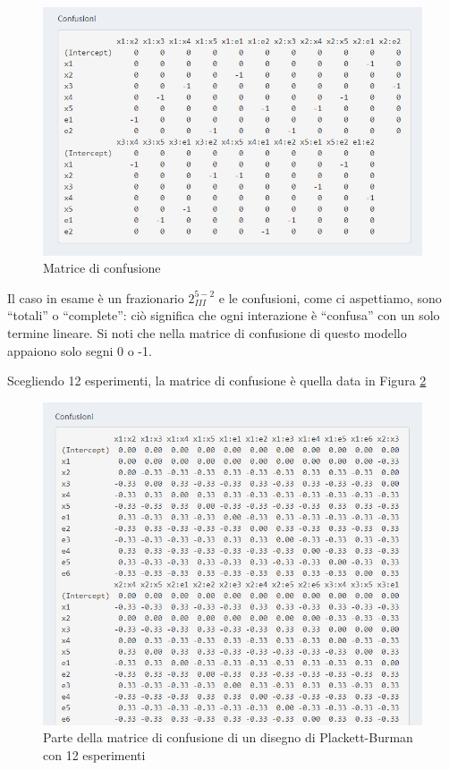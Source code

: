 \documentclass[
  11pt,
]{book}
\begin{document}
\begin{figure}[ht]

{\centering \includegraphics[width=1\linewidth]{Immagini/PB/02_matr_conf} 

}

\caption{Matrice di confusione}\label{fig:pb2}
\end{figure}

Il caso in esame è un frazionario \(2^{5-2}_{III}\) e le confusioni, come ci aspettiamo, sono ``totali'' o ``complete'': ciò significa che ogni interazione è ``confusa'' con un solo termine lineare. Si noti che nella matrice di confusione di questo modello appaiono solo segni 0 o -1.

Scegliendo 12 esperimenti, la matrice di confusione è quella data in Figura \ref{fig:pb3}

\begin{figure}[ht]

{\centering \includegraphics[width=1\linewidth]{Immagini/PB/03_matr_conf_12} 

}

\caption{Parte della matrice di confusione di un disegno di Plackett-Burman con 12 esperimenti}\label{fig:pb3}
\end{figure}
\end{document}
